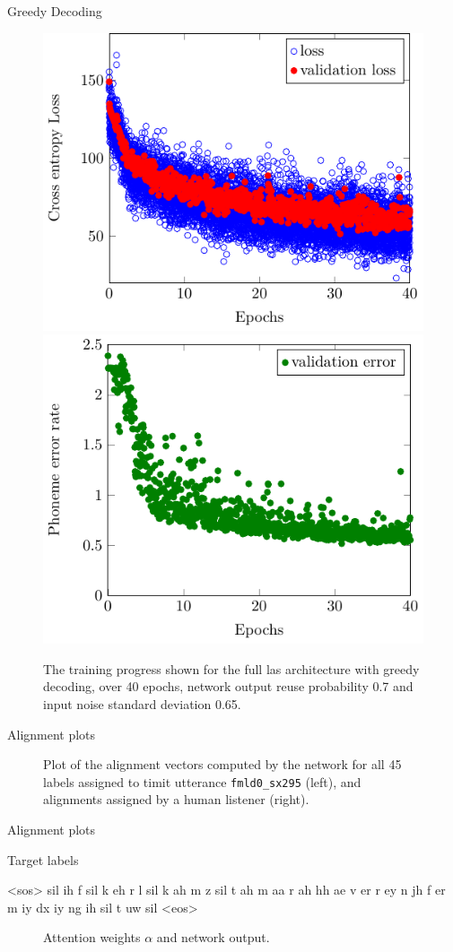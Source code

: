 \documentclass{beamer}
\begin{document}
\begin{frame}{Greedy Decoding}
	\begin{figure}
	\includegraphics[width=0.49\linewidth]{../tikz/LAS_no_reg_e40_p07_loss}
	\includegraphics[width=0.49\linewidth]{../tikz/LAS_no_reg_e40_p07_error}
	\caption{The training progress shown for the full las architecture with greedy decoding, over 40 epochs, network output reuse probability 0.7 and input noise standard deviation 0.65.}
	\label{fig:lasGreedy}
	\end{figure}
\end{frame}

\begin{frame}{Alignment plots}
	\begin{figure}
	\centering
	
	
	\caption{Plot of the alignment vectors computed by the network for all 45 labels assigned to timit utterance \texttt{fmld0\_sx295} (left), and alignments assigned by a human listener (right).}
	\label{fig:fullAttention}
	\end{figure}
\end{frame}

\begin{frame}{Alignment plots}
	\begin{block}{Target labels}
		\begin{semiverbatim}
		<sos>  sil  ih  f  sil  k  eh  r  l  sil  k  ah  m  z
		       sil  t  ah  m  aa  r  ah  hh  ae  v  er  r  ey
		       n  jh  f  er  m  iy  dx  iy  ng  ih
		       sil  t  uw  sil
		<eos>
		\end{semiverbatim}
	\end{block}

	\begin{figure}
	\centering
	
	
	
	\caption{Attention weights $\alpha$ and network output.}
	\label{fig:attention3}
	\end{figure}
\end{frame}
\end{document}
